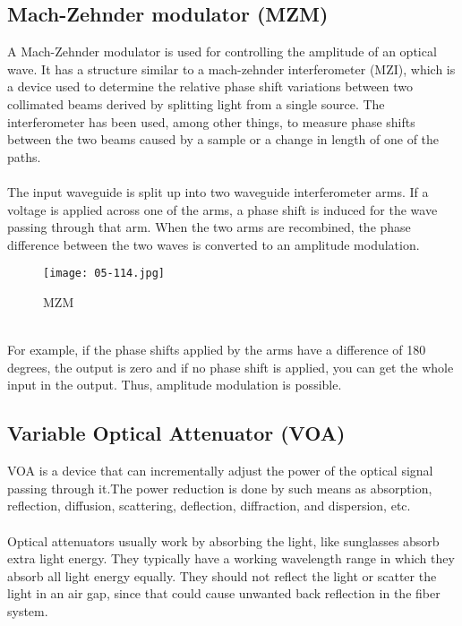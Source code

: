 \documentclass[hidelinks, 12pt]{report}
\begin{document}
\subsection{Mach-Zehnder modulator (MZM)}
A Mach-Zehnder modulator is used for controlling the amplitude of an optical wave. It has a structure similar to a mach-zehnder interferometer (MZI), which is a device used to determine the relative phase shift variations between two collimated beams derived by splitting light from a single source. The interferometer has been used, among other things, to measure phase shifts between the two beams caused by a sample or a change in length of one of the paths. \\
\\ The input waveguide is split up into two waveguide interferometer arms. If a voltage is applied across one of the arms, a phase shift is induced for the wave passing through that arm. When the two arms are recombined, the phase difference between the two waves is converted to an amplitude modulation.\\
\begin{figure}[H]
\centering
\texttt{[image: 05-114.jpg]}
\caption[MZM]{MZM}
\label{MZM}
\end{figure}
\\For example, if the phase shifts applied by the arms have a difference of 180 degrees, the output is zero and if no phase shift is applied, you can get the whole input in the output. Thus, amplitude modulation is possible.
\subsection{Variable Optical Attenuator (VOA)}
\justify
VOA is a device that can incrementally adjust the power of the optical signal passing through it.The power reduction is done by such means as absorption, reflection, diffusion, scattering, deflection, diffraction, and dispersion, etc.\\
\\Optical attenuators usually work by absorbing the light, like sunglasses absorb extra light energy. They typically have a working wavelength range in which they absorb all light energy equally. They should not reflect the light or scatter the light in an air gap, since that could cause unwanted back reflection in the fiber system.
\end{document}
